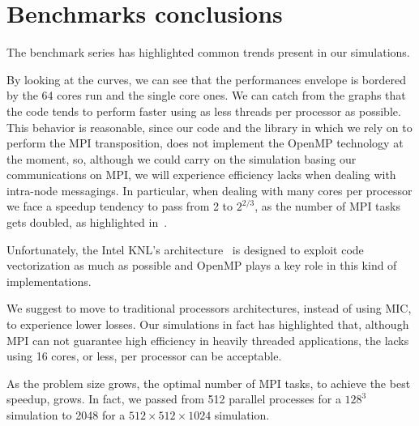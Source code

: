 \section{Benchmarks conclusions}
The benchmark series has highlighted common trends present in our simulations.
\par
By looking at the curves, we can see that the performances envelope is bordered by the 64 cores run and the single core ones.  We can catch from the graphs that the code tends to perform faster using as less threads per processor as possible.  This behavior is reasonable, since our code and the library in which we rely on to perform the MPI transposition, does not implement the OpenMP technology at the moment, so, although we could carry on the simulation basing our communications on MPI, we will experience efficiency lacks when dealing with intra-node messagings. In particular, when dealing with many cores per processor we face a speedup tendency to pass from 2 to $2^{2/3}$, as the number of MPI tasks gets doubled, as highlighted in~\cite{dns:gpu:supercomputer}. \par
Unfortunately, the Intel KNL's architecture~\cite{intel:xeonphi} is designed to exploit code vectorization as much as possible and OpenMP plays a key role in this kind of implementations. \par
We suggest to move to traditional processors architectures, instead of using MIC, to experience lower losses. Our simulations in fact has highlighted that, although MPI can not guarantee high efficiency in heavily threaded applications, the lacks using 16 cores, or less, per processor can be acceptable.\\
\par
As the problem size grows, the optimal number of MPI tasks, to achieve the best speedup, grows. In fact, we passed from 512 parallel processes for a $128^{3}$ simulation to 2048 for a $512\times 512 \times1024$ simulation. \par

